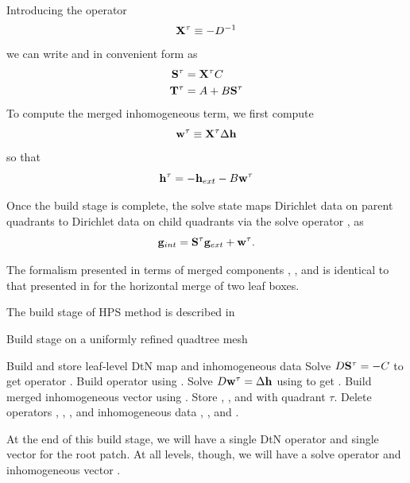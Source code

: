 Introducing  the operator
\begin{equation}
\mathbf X^{\tau} \equiv -D^{-1}
\label{eq:xtau}
\end{equation}
we can write \Ttau and  \Stau in convenient form as
\begin{equation}
\begin{aligned}
\mathbf S^{\tau} & = \mathbf X^{\tau} C \\
\mathbf T^{\tau} & = A + B\mathbf S^{\tau} \\
\label{eq:stau_ttau}
\end{aligned}
\end{equation}
To compute the merged inhomogeneous term, we first compute
\begin{equation}
\mathbf w^{\tau} \equiv \mathbf X^{\tau}\Delta \mathbf h
\label{eq:wtau}
\end{equation}
so that
\begin{equation}
\mathbf h^{\tau} = -\mathbf h_{ext} - B\mathbf w^{\tau}
\label{eq:htau}
\end{equation}

Once the build stage is complete, the solve state maps Dirichlet data on parent quadrants to Dirichlet data on child quadrants via the solve operator \Stau, as
\begin{equation}
\mathbf g_{int} = \mathbf S^{\tau} \mathbf g_{ext} + \mathbf w^{\tau}.
\label{eq:solve_eqn}
\end{equation}

The formalism presented in terms of merged components \Xtau, \Stau, \Ttau and \htau is identical to that presented in \citep{martinsson2015hierarchical} for the horizontal merge of two leaf boxes.

The build stage of HPS method is described in 
\begin{algorithm}[H]
    \caption{Build stage on a uniformly refined quadtree mesh}
    \begin{algorithmic}[0]
         
                \State Build and store leaf-level DtN map \Ttau and inhomogeneous data \htau
            \Else {}
                \State Solve $D\mathbf S^{\tau} = -C$ to get operator \Stau. 
                \State Build operator \Ttau using .      
                \State Solve $D\mathbf w^{\tau} = \Delta \mathbf h$ using to get \wtau.  
                \State Build merged inhomogeneous vector \htau using .
                \State Store \Stau, \Ttau, \htau and \wtau with quadrant $\tau$.
                \State Delete operators \Talpha, \Tbeta, \Tgamma, \Tomega and inhomogeneous data \halpha, \hbeta, \hgamma and \homega.
            \EndIf
        \EndFor
    \end{algorithmic}
    \label{alg:build_merge_uniform}
\end{algorithm}
At the end of this build stage, we will have a single DtN operator \Ttau and single vector \htau for the root patch.  At all levels, though, we will have a solve operator \Stau and inhomogeneous vector \wtau.

